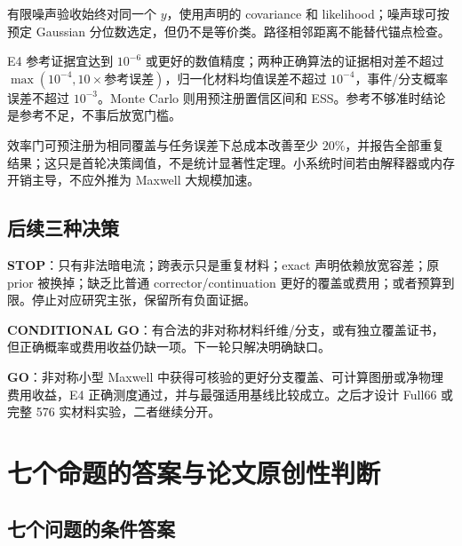 有限噪声验收始终对同一个 $y$，使用声明的 covariance 和 likelihood；噪声球可按预定 Gaussian 分位数选定，但仍不是等价类。路径相邻距离不能替代锚点检查。

E4 参考证据宜达到 $10^{-6}$ 或更好的数值精度；两种正确算法的证据相对差不超过 $\max(10^{-4},10\times\text{参考误差})$，归一化材料均值误差不超过 $10^{-4}$，事件/分支概率误差不超过 $10^{-3}$。Monte Carlo 则用预注册置信区间和 ESS。参考不够准时结论是参考不足，不事后放宽门槛。

效率门可预注册为相同覆盖与任务误差下总成本改善至少 $20\%$，并报告全部重复结果；这只是首轮决策阈值，不是统计显著性定理。小系统时间若由解释器或内存开销主导，不应外推为 Maxwell 大规模加速。

\subsection{后续三种决策}

\textbf{STOP}：只有非法暗电流；跨表示只是重复材料；exact 声明依赖放宽容差；原 prior 被换掉；缺乏比普通 corrector/continuation 更好的覆盖或费用；或者预算到限。停止对应研究主张，保留所有负面证据。

\textbf{CONDITIONAL GO}：有合法的非对称材料纤维/分支，或有独立覆盖证书，但正确概率或费用收益仍缺一项。下一轮只解决明确缺口。

\textbf{GO}：非对称小型 Maxwell 中获得可核验的更好分支覆盖、可计算图册或净物理费用收益，E4 正确测度通过，并与最强适用基线比较成立。之后才设计 Full66 或完整 576 实材料实验，二者继续分开。

\section{七个命题的答案与论文原创性判断}

\subsection{七个问题的条件答案}

